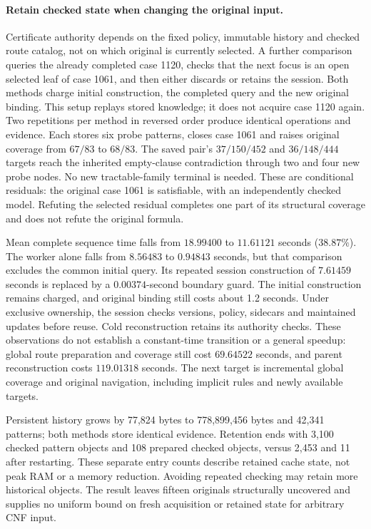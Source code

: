 \documentclass[11pt,a4paper]{article}
\numberwithin{equation}{section}
\theoremstyle{plain}
\theoremstyle{definition}
\theoremstyle{remark}
\begin{document}
\paragraph{Retain checked state when changing the original input.}
Certificate authority depends on the fixed policy, immutable history and checked
route catalog, not on which original is currently selected. A further comparison
queries the already completed case 1120, checks that the next focus is an open
selected leaf of case 1061, and then either discards or retains the session.
Both methods charge initial construction, the completed query and the new
original binding. This setup replays stored knowledge; it does not acquire
case 1120 again. Two repetitions per method in reversed order produce identical
operations and evidence. Each stores six probe patterns, closes case 1061 and
raises original coverage from $67/83$ to $68/83$. The saved pair's $37/150/452$
and $36/148/444$ targets reach the inherited empty-clause contradiction through
two and four new probe nodes. No new tractable-family terminal is needed.
These are conditional residuals: the original case 1061 is satisfiable, with an
independently checked model. Refuting the selected residual completes one part
of its structural coverage and does not refute the original formula.

Mean complete sequence time falls from $18.99400$ to $11.61121$ seconds
($38.87\%$). The worker alone falls from $8.56483$ to $0.94843$ seconds, but that
comparison excludes the common initial query. Its repeated session construction
of $7.61459$ seconds is replaced by a $0.00374$-second boundary guard. The initial
construction remains charged, and original binding still costs about 1.2
seconds. Under exclusive ownership, the session checks versions, policy,
sidecars and maintained updates before reuse. Cold reconstruction retains its authority
checks. These observations do not establish a constant-time transition or a
general speedup: global route preparation and coverage still cost $69.64522$
seconds, and parent reconstruction costs $119.01318$ seconds. The next target is
incremental global coverage and original navigation, including implicit rules
and newly available targets.

Persistent history grows by 77,824 bytes to 778,899,456 bytes and 42,341 patterns;
both methods store identical evidence. Retention ends with 3,100 checked pattern
objects and 108 prepared checked objects, versus 2,453 and 11 after restarting.
These separate entry counts describe retained cache state, not peak RAM or a
memory reduction. Avoiding repeated checking may retain more historical objects.
The result leaves fifteen originals structurally uncovered and supplies no
uniform bound on fresh acquisition or retained state for arbitrary CNF input.
\end{document}
